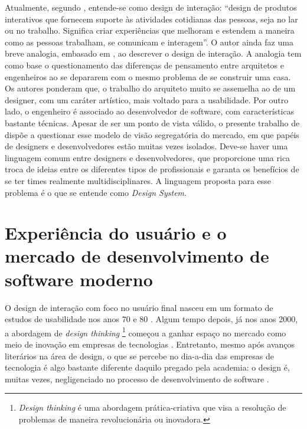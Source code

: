 Atualmente, segundo , entende-se como design de interação:
“design de produtos interativos que fornecem suporte às atividades cotidianas das pessoas, seja no lar ou no trabalho. Significa criar experiências que melhoram e estendem a maneira como as pessoas trabalham, se comunicam e interagem”. 
O autor ainda faz uma breve analogia, embasado em , ao descrever o design de interação. A analogia tem como base o questionamento das diferenças de pensamento entre arquitetos e engenheiros ao se depararem com o mesmo problema de se construir uma casa. Os autores ponderam que, o trabalho do arquiteto muito se assemelha ao de um designer, com um caráter artístico, mais voltado para a usabilidade. Por outro lado, o engenheiro é associado ao desenvolvedor de software, com características bastante técnicas. Apesar de ser um ponto de vista válido, o presente trabalho de dispõe a questionar esse modelo de visão segregatória do mercado, em que papéis de designers e desenvolvedores estão muitas vezes isolados. Deve-se haver uma linguagem comum entre designers e desenvolvedores, que proporcione uma rica troca de ideias entre os diferentes tipos de profissionais e garanta os benefícios de se ter times realmente multidisciplinares. A linguagem proposta para esse problema é o que se entende como \textit{Design System}.

\section{Experiência do usuário e o mercado de desenvolvimento de software moderno}
\label{experienciaUsuarioMercado}

O design de interação com foco no usuário final nasceu em um formato de estudos de usabilidade nos anos 70 e 80 \cite{gould1985designing, nielsen1994usability}. Algum tempo depois, já nos anos 2000, a abordagem de \textit{design thinking} \footnote{\textit{Design thinking} é uma abordagem prática-criativa que visa a resolução de problemas de maneira revolucionária ou inovadora.} começou a ganhar espaço no mercado como meio de inovação em empresas de tecnologias \cite{martin2009design}. Entretanto, mesmo após avanços literários na área de design, o que se percebe no dia-a-dia das empresas de tecnologia é algo bastante diferente daquilo pregado pela academia: o design é, muitas vezes, negligenciado no processo de desenvolvimento de software \cite{ruissalo2018operating}.

